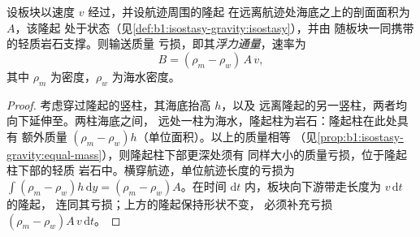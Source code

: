 \begin{proposition}[地幔柱的浮力通量]\label{prop:b1:hotspots:buoyancy}
设板块以速度 $v$ 经过，并设航迹周围的隆起
在远离航迹处海底之上的剖面面积为 $A$，该隆起
处于状态（见\cref{def:b1:isostasy-gravity:isostasy}），并由
随板块一同携带的轻质岩石支撑。则输送质量
亏损，即其\emph{浮力通量}，速率为
\[
  B = (\rho_m - \rho_w)\,A\,v ,
\]
其中 $\rho_m$ 为密度，$\rho_w$ 为海水密度。
\end{proposition}

\begin{proof}
考虑穿过隆起的竖柱，其海底抬高 $h$，以及
远离隆起的另一竖柱，两者均向下延伸至。两柱海底之间，
远处一柱为海水，隆起柱为岩石：隆起柱在此处具有
额外质量 $(\rho_m - \rho_w)h$（单位面积）。以上的质量相等
（见\cref{prop:b1:isostasy-gravity:equal-mass}），则隆起柱下部更深处须有
同样大小的质量亏损，位于隆起柱下部的轻质
岩石中。横穿航迹，单位航迹长度的亏损为
$\int(\rho_m - \rho_w)h\,\mathrm dy = (\rho_m - \rho_w)A$。在时间
$\mathrm dt$ 内，板块向下游带走长度为 $v\,\mathrm dt$ 的隆起，
连同其亏损；上方的隆起保持形状不变，
必须补充亏损 $(\rho_m - \rho_w)A\,v\,\mathrm dt$。
\end{proof}

